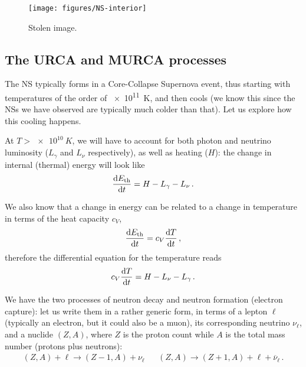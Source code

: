 \documentclass[main.tex]{subfiles}
\begin{document}


\begin{figure}[]
\centering
\texttt{[image: figures/NS-interior]}
\caption{Stolen image.}
\label{fig:NS-interior}
\end{figure}

\subsection{The URCA and MURCA processes}

The NS typically forms in a Core-Collapse Supernova event, thus starting with temperatures of the order of \SI{e11}{K}, and then cools (we know this since the NSs we have observed are typically much colder than that). Let us explore how this cooling happens.

At \(T > \SI{e10}{K}\), we will have to account for both photon and neutrino luminosity (\(L_\gamma \) and \(L_\nu \) respectively), as well as heating (\(H\)): the change in internal (thermal) energy will look like
%
\begin{align}
\dv{E _{\text{th}}}{t} = H - L_\gamma - L_\nu 
\,.
\end{align}

We also know that a change in energy can be related to a change in temperature in terms of the heat capacity \(c_V\),
%
\begin{align}
\dv{E _{\text{th}}}{t} = c_V \dv{T }{t}
\,,
\end{align}
%
therefore the differential equation for the temperature reads
%
\begin{align}
c_V \dv{T }{t} = H - L_\nu - L_\gamma 
\,.
\end{align}

We have the two processes of neutron decay and neutron formation (electron capture): let us write them in a rather generic form, in terms of a lepton \(\ell\) (typically an electron, but it could also be a muon), its corresponding neutrino \(\nu _\ell\), and a nuclide \((Z, A)\), where \(Z\) is the proton count while \(A\) is the total mass number (protons plus neutrons):
%
\begin{align}
(Z, A) + \ell \to (Z-1, A) + \nu_\ell
&&
(Z, A) \to (Z+1, A) + \ell + \overline{\nu}_\ell
\,.
\end{align}
\end{document}

